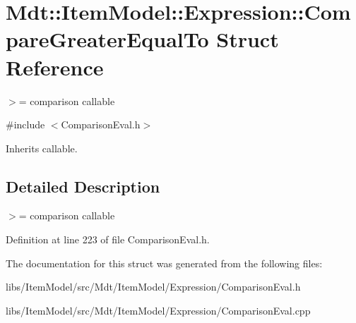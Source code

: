 \hypertarget{struct_mdt_1_1_item_model_1_1_expression_1_1_compare_greater_equal_to}{}\section{Mdt\+:\+:Item\+Model\+:\+:Expression\+:\+:Compare\+Greater\+Equal\+To Struct Reference}
\label{struct_mdt_1_1_item_model_1_1_expression_1_1_compare_greater_equal_to}


$>$= comparison callable  




{\ttfamily \#include $<$Comparison\+Eval.\+h$>$}



Inherits callable.



\subsection{Detailed Description}
$>$= comparison callable 

Definition at line 223 of file Comparison\+Eval.\+h.



The documentation for this struct was generated from the following files\+:\begin{DoxyCompactItemize}
\item 
libs/\+Item\+Model/src/\+Mdt/\+Item\+Model/\+Expression/Comparison\+Eval.\+h\item 
libs/\+Item\+Model/src/\+Mdt/\+Item\+Model/\+Expression/Comparison\+Eval.\+cpp\end{DoxyCompactItemize}
